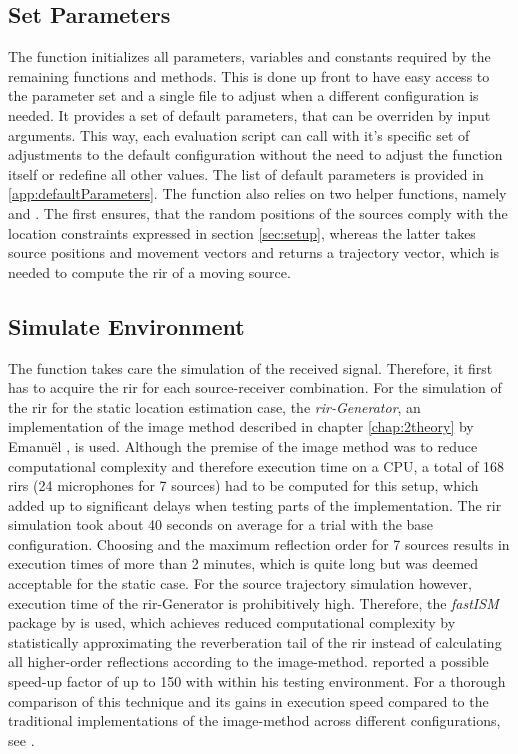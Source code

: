 \subsection{Set Parameters}
The  function initializes all parameters, variables and constants required by the remaining functions and methods. This is done up front to have easy access to the parameter set and a single file to adjust when a different configuration is needed. It provides a set of default parameters, that can be overriden by input arguments. This way, each evaluation script can call  with it's specific set of adjustments to the default configuration without the need to adjust the function itself or redefine all other values. The list of default parameters is provided in \ref{app:defaultParameters}.
The function also relies on two helper functions, namely  and . The first ensures, that the random positions of the sources comply with the location constraints expressed in section \ref{sec:setup}, whereas the latter takes source positions and movement vectors and returns a trajectory vector, which is needed to compute the \gls{rir} of a moving source.

\subsection{Simulate Environment}
The  function takes care the simulation of the received signal. Therefore, it first has to acquire the \gls{rir} for each source-receiver combination. For the simulation of the \gls{rir} for the static location estimation case, the \emph{\gls{rir}-Generator}, an implementation of the image method described in chapter \ref{chap:2theory} by Emanuël \citet*{Habets2014}, is used. Although the premise of the image method was to reduce computational complexity and therefore execution time on a CPU, a total of 168 \glspl{rir} (24 microphones for 7 sources) had to be computed for this setup, which added up to significant delays when testing parts of the implementation. The \gls{rir} simulation took about 40 seconds on average for a trial with the base configuration. Choosing  and the maximum reflection order for 7 sources results in execution times of more than 2 minutes, which is quite long but was deemed acceptable for the static case. For the source trajectory simulation however, execution time of the \gls{rir}-Generator is prohibitively high. Therefore, the \emph{fastISM} package by \citeauthor{Lehmann2010} is used, which achieves reduced computational complexity by statistically approximating the reverberation tail of the \gls{rir} instead of calculating all higher-order reflections according to the image-method. \citeauthor{Lehmann2010} reported a possible speed-up factor of up to 150 with  within his testing environment. For a thorough comparison of this technique and its gains in execution speed compared to the traditional implementations of the image-method across different configurations, see \cite{Lehmann2010}.

